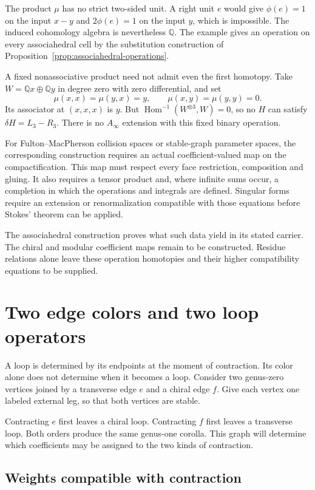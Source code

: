 The product $\mu$ has no strict two-sided unit.
A right unit $e$ would give $\phi(e)=1$ on the input $x-y$
and $2\phi(e)=1$ on the input $y$, which is impossible.
The induced cohomology algebra is nevertheless $\mathbb Q$.
The example gives an operation on every associahedral cell by the
substitution construction of Proposition~\ref{prop:associahedral-operations}.

A fixed nonassociative product need not admit even the first homotopy.
Take $W=\mathbb Qx\oplus\mathbb Qy$ in degree zero with zero differential,
and set
\[
 \mu(x,x)=\mu(y,x)=y,\qquad
 \mu(x,y)=\mu(y,y)=0.
\]
Its associator at $(x,x,x)$ is $y$.
But $\operatorname{Hom}^{-1}(W^{\otimes3},W)=0$,
so no $H$ can satisfy $\delta H=L_3-R_3$.
There is no $A_\infty$ extension with this fixed binary operation.

For Fulton--MacPherson collision spaces or stable-graph parameter spaces,
the corresponding construction requires an actual coefficient-valued map
on the compactification.
This map must respect every face restriction, composition and gluing.
It also requires a tensor product and, where infinite sums occur,
a completion in which the operations and integrals are defined.
Singular forms require an extension or renormalization compatible with
those equations before Stokes' theorem can be applied.

The associahedral construction proves what such data yield in its stated
carrier.
The chiral and modular coefficient maps remain to be constructed.
Residue relations alone leave these operation homotopies and their
higher compatibility equations to be supplied.

\chapter{Two edge colors and two loop operators}\label{ch:two-edge-operators}

A loop is determined by its endpoints at the moment of contraction.
Its color alone does not determine when it becomes a loop.
Consider two genus-zero vertices joined by a transverse edge $e$ and a chiral edge $f$.
Give each vertex one labeled external leg, so that both vertices are stable.

Contracting $e$ first leaves a chiral loop.
Contracting $f$ first leaves a transverse loop.
Both orders produce the same genus-one corolla.
This graph will determine which coefficients may be assigned to the two kinds of contraction.

\section{Weights compatible with contraction}

